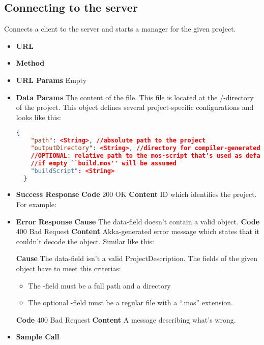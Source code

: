 \subsection{Connecting to the server}
Connects a client to the server and starts a manager for the given project.



\begin{itemize}
\item \textbf{URL} 
\item \textbf{Method} 
\item \textbf{URL Params} Empty
\item \textbf{Data Params}
  The content of the  file. This file is located at the /-directory of the project.
  This object defines several project-specific configurations and looks like this:
  \begin{lstlisting}[basicstyle=\small,language=json]
  {
    "path": <String>, //absolute path to the project
    "outputDirectory": <String>, //directory for compiler-generated files
    //OPTIONAL: relative path to the mos-script that's used as default-script
    //if empty ``build.mos'' will be assumed
    "buildScript": <String>
  }
  \end{lstlisting}
\item \textbf{Success Response}
  \newline\textbf{Code} 200 OK
  \newline\textbf{Content} ID which identifies the project. For example: 
\item \textbf{Error Response}
  \newline\textbf{Cause} The data-field doesn't contain a valid object.
  \newline\textbf{Code} 400 Bad Request
  \newline\textbf{Content} Akka-generated error message which states that it couldn't decode the
  object. Similar like this: 

  \fixedspace\textbf{Cause} The data-field isn't a valid ProjectDescription.
  The fields of the given object have to meet this criterias:
  \begin{itemize}
  \item The -field must be a full path and a directory
  \item The optional -field must be a regular file with a ``.mos'' extension.
  \end{itemize}
  \textbf{Code} 400 Bad Request
  \newline\textbf{Content} A message describing what's wrong.
  \item \textbf{Sample Call}
\end{itemize}
